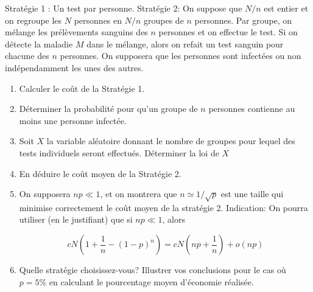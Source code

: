 \documentclass[10pt]{article}
\begin{document}
Stratégie 1 : Un test par personne.
Stratégie 2: On suppose que $N / n$ est entier et on regroupe les $N$ personnes en $N / n$ groupes de $n$ personnes. Par groupe, on mélange les prélèvements sanguins des $n$ personnes et on effectue le test. Si on détecte la maladie $M$ dans le mélange, alors on refait un test sanguin pour chacune des $n$ personnes. On supposera que les personnes sont infectées ou non indépendamment les unes des autres.
\begin{enumerate}
    \item Calculer le coût de la Stratégie 1.
    \item Déterminer la probabilité pour qu'un groupe de $n$ personnes contienne au moins une personne infectée.
    \item Soit $X$ la variable aléatoire donnant le nombre de groupes pour lequel des tests individuels seront effectués. Déterminer la loi de $X$
    \item En déduire le coût moyen de la Stratégie 2.
    \item On supposera $n p \ll 1$, et on montrera que $n \simeq 1 / \sqrt{p}$ est une taille qui minimise correctement le coût moyen de la stratégie 2.
    Indication: On pourra utiliser (en le justifiant) que si $n p \ll 1$, alors

$$
c N\left(1+\frac{1}{n}-(1-p)^n\right)=c N\left(n p+\frac{1}{n}\right)+o(n p)
$$

    \item Quelle stratégie choisissez-vous? Illustrer vos conclusions pour le cas où $p=5 \%$ en calculant le pourcentage moyen d'économie réalisée.
\end{enumerate}

\vspace{2cm}
\end{document}
